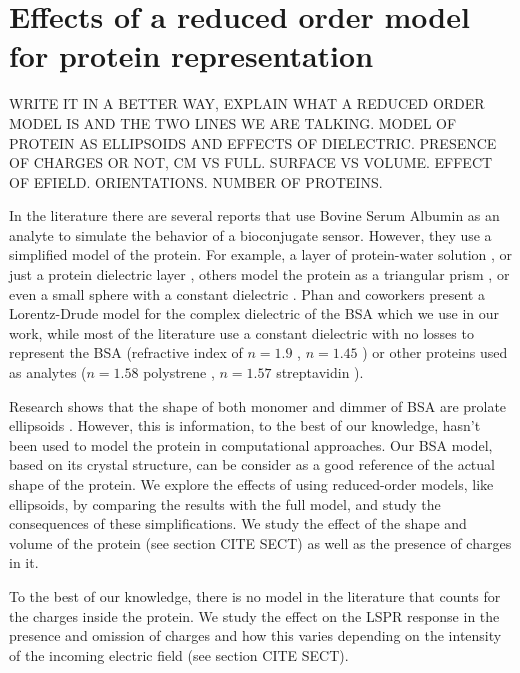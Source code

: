


\chapter{Effects of a reduced order model for protein representation}
\graphicspath{{rom_studies/figs/}}


{\color{red}
WRITE IT IN A BETTER WAY, EXPLAIN WHAT A REDUCED ORDER MODEL IS AND THE TWO LINES WE ARE TALKING. 
MODEL OF PROTEIN AS ELLIPSOIDS AND EFFECTS OF DIELECTRIC.
PRESENCE OF CHARGES OR NOT, CM VS FULL.
SURFACE VS VOLUME.
EFFECT OF EFIELD.
ORIENTATIONS.
NUMBER OF PROTEINS. 
}

In the literature there are several reports that use Bovine Serum Albumin as an analyte
to simulate the behavior of a bioconjugate sensor. However, they use a simplified model
of the protein. For example, a layer of protein-water solution \cite{PhanETal2013}, 
or just a protein dielectric layer \cite{NghiemETal2012}, others model the
protein as a triangular prism \cite{DanHu2014}, or even a small sphere with a 
constant dielectric \cite{SantiagoCordobaETal2011, UngerETal2009}. Phan and 
coworkers \cite{PhanETal2013} present a Lorentz-Drude model for the complex 
dielectric of the BSA which we use in our work, while most of the literature 
use a constant dielectric with no losses to represent the BSA 
(refractive index of $n= 1.9$ \cite{NghiemETal2012}, $n= 1.45$ \cite{SantiagoCordobaETal2011}) or
other proteins used as analytes ($n=1.58$ polystrene \cite{UngerETal2009}, $n=1.57$ 
streptavidin \cite{ShenETal2013}). 

Research shows that the shape of both monomer and dimmer of 
BSA are prolate ellipsoids \cite{MoserETal1966, SquireETal1968, WrightETal1975}. However,
this is information, to the best of our knowledge, hasn't been used to model the 
protein in computational approaches. Our BSA model, based on its crystal 
structure, can be consider as a good reference of the actual shape of the protein. We 
explore the effects of using reduced-order models, like ellipsoids, by comparing 
the results with the full model, and study the consequences of these 
simplifications. We study the effect of the shape and volume of the protein
(see section CITE SECT) as well as the presence of charges in it. 

To the best of our knowledge, there is no model in the literature that counts 
for the charges inside the protein. We study the effect on the LSPR response 
in the presence and omission of charges and how this varies depending on the 
intensity of the incoming electric field (see section CITE SECT).\\  


